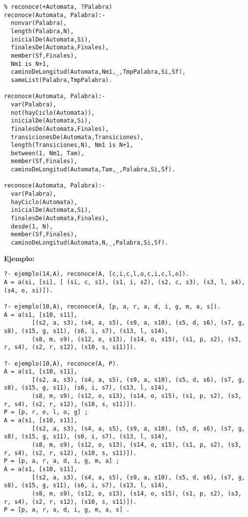 \documentclass[10pt, a4paper,english,spanish,hidelinks]{article}
\begin{document}
\begin{verbatim}
% reconoce(+Automata, ?Palabra)
reconoce(Automata, Palabra):-
  nonvar(Palabra),
  length(Palabra,N),
  inicialDe(Automata,Si),
  finalesDe(Automata,Finales),
  member(Sf,Finales),
  Nm1 is N+1,
  caminoDeLongitud(Automata,Nm1,_,TmpPalabra,Si,Sf),
  sameList(Palabra,TmpPalabra).

reconoce(Automata, Palabra):-
  var(Palabra),
  not(hayCiclo(Automata)),
  inicialDe(Automata,Si),
  finalesDe(Automata,Finales),
  transicionesDe(Automata,Transiciones),
  length(Transiciones,N), Nm1 is N+1,
  between(1, Nm1, Tam),
  member(Sf,Finales),
  caminoDeLongitud(Automata,Tam,_,Palabra,Si,Sf).

reconoce(Automata, Palabra):-
  var(Palabra),
  hayCiclo(Automata),
  inicialDe(Automata,Si),
  finalesDe(Automata,Finales),
  desde(1, N),
  member(Sf,Finales),
  caminoDeLongitud(Automata,N,_,Palabra,Si,Sf).
\end{verbatim}

\textbf{Ejemplo:}
\begin{verbatim}
?- ejemplo(14,A), reconoce(A, [c,i,c,l,o,c,i,c,l,o]).
A = a(si, [si], [ (si, c, s1), (s1, i, s2), (s2, c, s3), (s3, l, s4), (s4, o, si)]).

?- ejemplo(10,A), reconoce(A, [p, a, r, a, d, i, g, m, a, s]).
A = a(s1, [s10, s11], 
        [(s2, a, s3), (s4, a, s5), (s9, a, s10), (s5, d, s6), (s7, g, s8), (s15, g, s11), (s6, i, s7), (s13, l, s14), 
        (s8, m, s9), (s12, o, s13), (s14, o, s15), (s1, p, s2), (s3, r, s4), (s2, r, s12), (s10, s, s11)]).

?- ejemplo(10,A), reconoce(A, P).
A = a(s1, [s10, s11], 
        [(s2, a, s3), (s4, a, s5), (s9, a, s10), (s5, d, s6), (s7, g, s8), (s15, g, s11), (s6, i, s7), (s13, l, s14), 
        (s8, m, s9), (s12, o, s13), (s14, o, s15), (s1, p, s2), (s3, r, s4), (s2, r, s12), (s10, s, s11)]).
P = [p, r, o, l, o, g] ;
A = a(s1, [s10, s11], 
        [(s2, a, s3), (s4, a, s5), (s9, a, s10), (s5, d, s6), (s7, g, s8), (s15, g, s11), (s6, i, s7), (s13, l, s14), 
        (s8, m, s9), (s12, o, s13), (s14, o, s15), (s1, p, s2), (s3, r, s4), (s2, r, s12), (s10, s, s11)]).
P = [p, a, r, a, d, i, g, m, a] ;
A = a(s1, [s10, s11], 
        [(s2, a, s3), (s4, a, s5), (s9, a, s10), (s5, d, s6), (s7, g, s8), (s15, g, s11), (s6, i, s7), (s13, l, s14), 
        (s8, m, s9), (s12, o, s13), (s14, o, s15), (s1, p, s2), (s3, r, s4), (s2, r, s12), (s10, s, s11)]).
P = [p, a, r, a, d, i, g, m, a, s] .
\end{verbatim}
\end{document}
